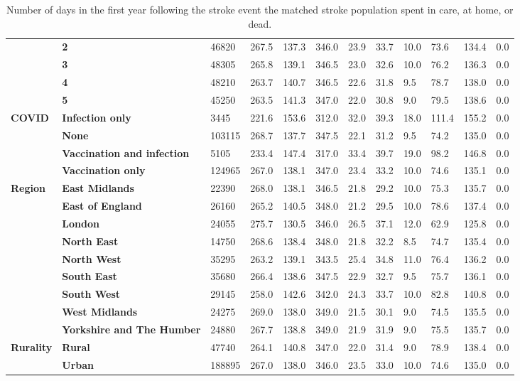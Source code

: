 \begin{landscape}
\begin{table}[!ht]
\begin{tabular}{|l|l|l|l|l|l|l|l|l|l|l|l|}
        & \bf 2 & 46820 & 267.5 & 137.3 & 346.0 & 23.9 & 33.7 & 10.0 & 73.6 & 134.4 & 0.0 \\ 
        & \bf 3 & 48305 & 265.8 & 139.1 & 346.5 & 23.0 & 32.6 & 10.0 & 76.2 & 136.3 & 0.0 \\ 
        & \bf 4 & 48210 & 263.7 & 140.7 & 346.5 & 22.6 & 31.8 & 9.5 & 78.7 & 138.0 & 0.0 \\ 
        & \bf 5 & 45250 & 263.5 & 141.3 & 347.0 & 22.0 & 30.8 & 9.0 & 79.5 & 138.6 & 0.0 \\ \hline
        \multirow{4}{*}{\bf COVID} & \bf Infection only & 3445 & 221.6 & 153.6 & 312.0 & 32.0 & 39.3 & 18.0 & 111.4 & 155.2 & 0.0 \\
        & \bf None & 103115 & 268.7 & 137.7 & 347.5 & 22.1 & 31.2 & 9.5 & 74.2 & 135.0 & 0.0 \\
        & \bf Vaccination and infection & 5105 & 233.4 & 147.4 & 317.0 & 33.4 & 39.7 & 19.0 & 98.2 & 146.8 & 0.0 \\ 
        & \bf Vaccination only & 124965 & 267.0 & 138.1 & 347.0 & 23.4 & 33.2 & 10.0 & 74.6 & 135.1 & 0.0 \\ \hline
        \multirow{8}{*}{\bf Region} & \bf East Midlands & 22390 & 268.0 & 138.1 & 346.5 & 21.8 & 29.2 & 10.0 & 75.3 & 135.7 & 0.0 \\
        & \bf East of England & 26160 & 265.2 & 140.5 & 348.0 & 21.2 & 29.5 & 10.0 & 78.6 & 137.4 & 0.0 \\ 
        & \bf London & 24055 & 275.7 & 130.5 & 346.0 & 26.5 & 37.1 & 12.0 & 62.9 & 125.8 & 0.0 \\
        & \bf North East & 14750 & 268.6 & 138.4 & 348.0 & 21.8 & 32.2 & 8.5 & 74.7 & 135.4 & 0.0 \\
        & \bf North West & 35295 & 263.2 & 139.1 & 343.5 & 25.4 & 34.8 & 11.0 & 76.4 & 136.2 & 0.0 \\
        & \bf South East & 35680 & 266.4 & 138.6 & 347.5 & 22.9 & 32.7 & 9.5 & 75.7 & 136.1 & 0.0 \\
        & \bf South West & 29145 & 258.0 & 142.6 & 342.0 & 24.3 & 33.7 & 10.0 & 82.8 & 140.8 & 0.0 \\
        & \bf West Midlands & 24275 & 269.0 & 138.0 & 349.0 & 21.5 & 30.1 & 9.0 & 74.5 & 135.5 & 0.0 \\
        & \bf Yorkshire and The Humber & 24880 & 267.7 & 138.8 & 349.0 & 21.9 & 31.9 & 9.0 & 75.5 & 135.7 & 0.0 \\ \hline
        \multirow{2}{*}{\bf Rurality} & \bf Rural & 47740 & 264.1 & 140.8 & 347.0 & 22.0 & 31.4 & 9.0 & 78.9 & 138.4 & 0.0 \\ 
        & \bf Urban & 188895 & 267.0 & 138.0 & 346.0 & 23.5 & 33.0 & 10.0 & 74.6 & 135.0 & 0.0 \\ \hline
    \end{tabular}
    \caption{Number of days in the first year following the stroke event the matched stroke population spent in care, at home, or dead.}
    \label{tab:stroke_location_post_stroke}
\end{table}


\end{landscape}

